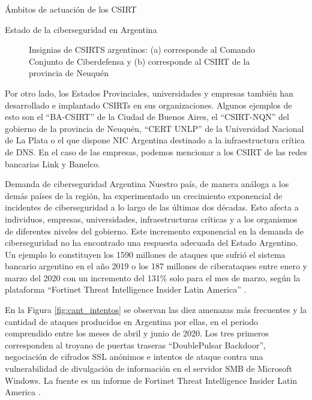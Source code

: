 \begin{section}{Ámbitos de actuación de los CSIRT}
\begin{subsection}{Estado de la ciberseguridad en Argentina}
\begin{figure}[H]
            \quad
            \caption{Insignias de CSIRTS argentinos: (a) corresponde al Comando Conjunto de Ciberdefensa y (b) corresponde al CSIRT de la provincia de Neuquén}
            \label{fig:ciberdef_nqn}
        \end{figure}
        \FloatBarrier
        Por otro lado, los Estados Provinciales, universidades y empresas también han desarrollado e implantado CSIRTs en sus organizaciones. Algunos ejemplos de esto son el “BA-CSIRT”\cite{ba_csirt} de la Ciudad de Buenos Aires, el “CSIRT-NQN”\cite{nqn_csirt} del gobierno de la provincia de Neuquén, “CERT UNLP” \cite{unlp_cert} de la Universidad Nacional de La Plata o el que dispone NIC Argentina \cite{nic_arg} destinado a la infraestructura crítica de DNS. En el caso de las empresas, podemos mencionar a los CSIRT de las redes bancarias Link \cite{red_link} y Banelco\cite{banelco}.
            \begin{subsubsection}{Demanda de ciberseguridad Argentina}
            Nuestro país, de manera análoga a los demás países de la región, ha experimentado un crecimiento exponencial de incidentes de ciberseguridad a lo largo de las últimas dos décadas. Esto afecta a individuos, empresas, universidades, infraestructuras críticas y a los organismos de diferentes niveles del gobierno. Este incremento exponencial en la demanda de ciberseguridad no ha encontrado una respuesta adecuada del Estado Argentino. Un ejemplo lo constituyen los 1590 millones de ataques \cite{iProUP} que sufrió el sistema bancario argentino en el año 2019 o los 187 millones de ciberataques entre enero y marzo del 2020 con un incremento del 131\% solo para el mes de marzo, según la plataforma “Fortinet Threat Intelligence Insider Latin America” \cite{fortinet}. \par 
            En la Figura \ref{fig:cant_intentos} se observan las diez amenazas más frecuentes y la cantidad de ataques producidos en Argentina por ellas, en el periodo comprendido entre los meses de abril y junio de 2020. Los tres primeros corresponden al troyano de puertas traseras “DoublePulsar Backdoor”, negociación de cifrados SSL anónimos e intentos de ataque contra una vulnerabilidad de divulgación de información en el servidor SMB de Microsoft Windows. La fuente es un informe de Fortinet Threat Intelligence Insider Latin America \cite{fortinet}.\par

\end{subsubsection}
\end{subsection}
\end{section}

